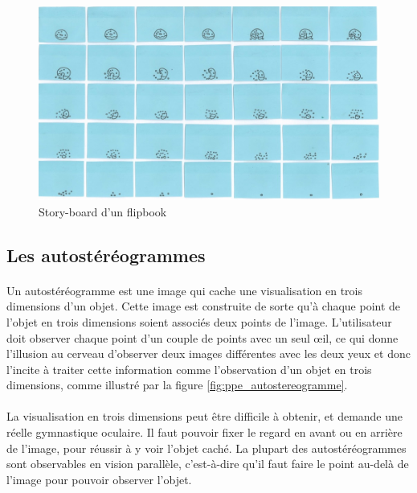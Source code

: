 \begin{figure}[h!]
		\centering
		\includegraphics[scale=0.7]{flipbook.png}
		\caption{\label{fig:flipbook} Story-board d’un flipbook \protect \footnotemark }
\end{figure}

\subsection{Les autostéréogrammes}	

\paragraph{}
	Un autostéréogramme est une image qui cache une visualisation en trois dimensions d’un objet. Cette image est construite de sorte qu'à chaque point de l'objet en trois dimensions soient associés deux points de l'image. L'utilisateur doit observer chaque point d'un couple de points avec un seul œil, ce qui donne l'illusion au cerveau d'observer deux images différentes avec les deux yeux et donc l'incite à traiter cette information comme l'observation d'un objet en trois dimensions, comme illustré par la figure \ref{fig:ppe_autostereogramme}.

\paragraph{}
	La visualisation en trois dimensions peut être difficile à obtenir, et demande une réelle gymnastique oculaire. Il faut pouvoir fixer le regard en avant ou en arrière de l’image, pour réussir à y voir l’objet caché. La plupart des autostéréogrammes sont observables en vision parallèle, c'est-à-dire qu'il faut faire le point au-delà de l'image pour pouvoir observer l'objet.

